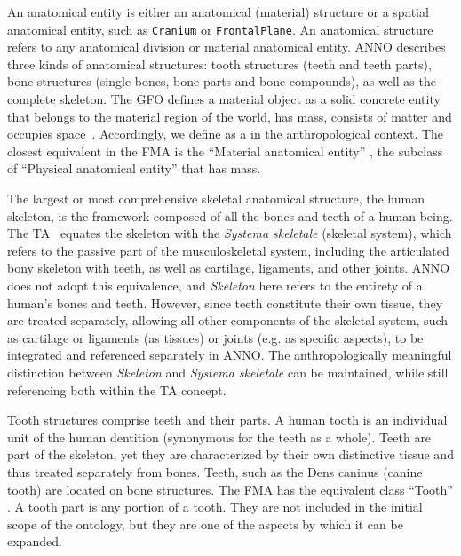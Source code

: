\documentclass[sw]{iosart2x}
\newcommand{\anno}[1]{\href{https://annosaxfdm.de/ontology/#1}{\texttt{#1}}}
\newcommand{\latin}[1]{\emph{#1}}
\begin{document}
An anatomical entity is either an anatomical (material) structure or a spatial anatomical entity, such as \anno{Cranium} or \anno{FrontalPlane}.
An anatomical structure refers to any anatomical division or material anatomical entity.
ANNO describes three kinds of anatomical structures: tooth structures (teeth and teeth parts), bone structures (single bones, bone parts and bone compounds), as well as the complete skeleton.
The GFO defines a material object  as a solid concrete entity that belongs to the material region of the world, has mass, consists of matter and occupies space~\citep{gfospace}.
Accordingly, we define  as a  in the anthropological context.
The closest equivalent in the FMA is the \enquote{Material anatomical entity} , the subclass of \enquote{Physical anatomical entity}  that has mass.

The largest or most comprehensive skeletal anatomical structure, the human skeleton, is the framework composed of all the bones and teeth of a human being.
The TA~\citep{ta2} equates the skeleton with the \latin{Systema skeletale} (skeletal system), which refers to the passive part of the musculoskeletal system, including the articulated bony skeleton with teeth, as well as cartilage, ligaments, and other joints.
ANNO does not adopt this equivalence, and \emph{Skeleton} here refers to the entirety of a human's bones and teeth.
However, since teeth constitute their own tissue, they are treated separately, allowing all other components of the skeletal system, such as cartilage or ligaments (as tissues) or joints (e.g. as specific aspects), to be integrated and referenced separately in ANNO.
The anthropologically meaningful distinction between \emph{Skeleton} and \latin{Systema skeletale} can be maintained, while still referencing both within the TA concept.

Tooth structures comprise teeth and their parts.
A human tooth is an individual unit of the human dentition (synonymous for the teeth as a whole).
Teeth are part of the skeleton, yet they are characterized by their own distinctive tissue and thus treated separately from bones.
Teeth, such as the Dens caninus (canine tooth) are located on bone structures.
The FMA has the equivalent class \enquote{Tooth} .
A tooth part is any portion of a tooth.
They are not included in the initial scope of the ontology, but they are one of the aspects by which it can be expanded.
\end{document}
